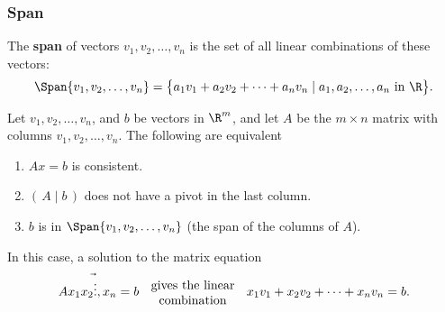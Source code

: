 \begin{frame}
\frametitle{Span}

The \textbf{span} of vectors $v_1,v_2,\ldots,v_n$ is the set of all linear
combinations of these vectors:
\[ \Span\{v_1,v_2,\ldots,v_n\}
= \bigl\{ a_1v_1+a_2v_2+\cdots+a_nv_n\mid a_1,a_2,\ldots,a_n\text{ in }\R \bigr\}. \]

\pause
\begin{thm}
  Let $v_1,v_2,\ldots,v_n$, and $b$ be vectors in $\R^m$, and let $A$ be the
  $m\times n$ matrix with columns $v_1,v_2,\ldots,v_n$.  The following are
  equivalent
  \begin{enumerate}
    \pause
  \item $Ax = b$ is consistent.
    \pause
  \item $(\,A\mid b\,)$ does not have a pivot in \pause the last column.
    \pause
  \item $b$ is in $\Span\{v_1,v_2,\ldots,v_n\}$ (the span of the columns of
    $A$).
  \end{enumerate}
\end{thm}

\pause
In this case, a solution to the matrix equation
\[ A\vec{x_1 x_2 \vdots, x_n} = b
\parbox{3cm}{\centering gives the linear\\combination}
x_1v_1 + x_2v_2 + \cdots + x_nv_n = b. \]

\end{frame}



